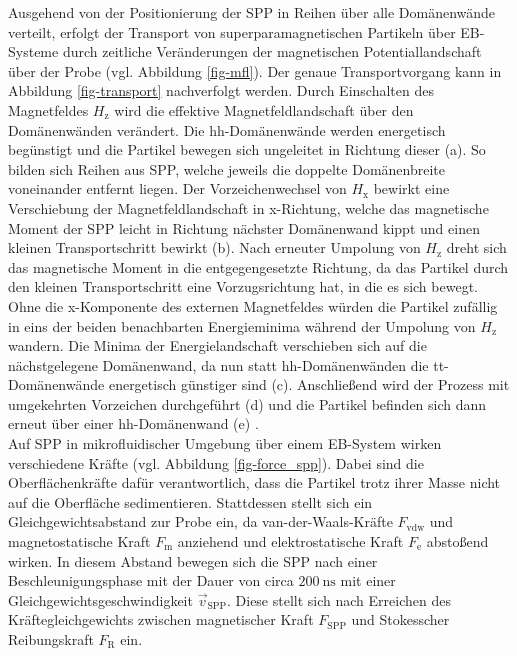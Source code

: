 \documentclass[page,pdftex,12pt,a4paper,twoside,openright]{scrbook}
\begin{document}
Ausgehend von der Positionierung der SPP in Reihen über alle Domänenwände verteilt, erfolgt der Transport von superparamagnetischen Partikeln über EB-Systeme durch zeitliche Veränderungen der magnetischen Potentiallandschaft über der Probe (vgl. Abbildung \ref{fig-mfl}). Der genaue Transportvorgang kann in Abbildung \ref{fig-transport} nachverfolgt werden. Durch Einschalten des Magnetfeldes \(H_\mathrm{z}\) wird die effektive Magnetfeldlandschaft über den Domänenwänden verändert. Die hh-Domänenwände werden energetisch begünstigt und die Partikel bewegen sich ungeleitet in Richtung dieser (a). So bilden sich Reihen aus SPP, welche jeweils die doppelte Domänenbreite voneinander entfernt liegen. Der Vorzeichenwechsel von \(H_\mathrm{x}\) bewirkt eine Verschiebung der Magnetfeldlandschaft in x-Richtung, welche das magnetische Moment der SPP leicht in Richtung nächster Domänenwand kippt und einen kleinen Transportschritt bewirkt (b). Nach erneuter Umpolung von \(H_\mathrm{z}\) dreht sich das magnetische Moment in die entgegengesetzte Richtung, da das Partikel durch den kleinen Transportschritt eine Vorzugsrichtung hat, in die es sich bewegt. Ohne die x-Komponente des externen Magnetfeldes würden die Partikel zufällig in eins der beiden benachbarten Energieminima während der Umpolung von \(H_\mathrm{z}\) wandern. Die Minima der Energielandschaft verschieben sich auf die nächstgelegene Domänenwand, da nun statt hh-Domänenwänden die tt-Domänenwände energetisch günstiger sind (c). Anschließend wird der Prozess mit umgekehrten Vorzeichen durchgeführt (d) und die Partikel befinden sich dann erneut über einer hh-Domänenwand (e) \cite{holzinger_directed_2015}.\\

Auf SPP in mikrofluidischer Umgebung über einem EB-System wirken verschiedene Kräfte (vgl. Abbildung \ref{fig-force_spp}). Dabei sind die Oberflächenkräfte dafür verantwortlich, dass die Partikel trotz ihrer Masse nicht auf die Oberfläche sedimentieren.  Stattdessen stellt sich ein Gleichgewichtsabstand zur Probe ein, da van-der-Waals-Kräfte \(F_\mathrm{vdw}\) und magnetostatische Kraft \(F_\mathrm{m}\) anziehend und elektrostatische Kraft \(F_\mathrm{e}\) abstoßend wirken. In diesem Abstand bewegen sich die SPP nach einer Beschleunigungsphase mit der Dauer von circa \(\SI{200}{\nano\s}\) mit einer Gleichgewichtsgeschwindigkeit \(\vec{v}_\mathrm{SPP}\). Diese stellt sich nach Erreichen des Kräftegleichgewichts zwischen magnetischer Kraft \(F_\mathrm{SPP}\) und Stokesscher Reibungskraft \(F_\mathrm{R}\) ein.\\
\end{document}
